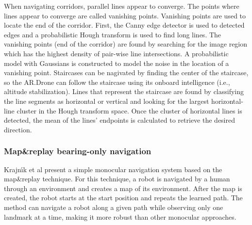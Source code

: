 When navigating corridors, parallel lines appear to converge.
The points where lines appear to converge are called vanishing points.
Vanishing points are used to locate the end of the corridor. 
First, the Canny edge detector \cite{canny1986computational} is used to detected edges and a probabilistic Hough transform \cite{kiryati1991probabilistic} is used to find long lines.
The vanishing points (end of the corridor) are found by searching for the image region which has the highest density of pair-wise line intersections.
A probabilistic model with Gaussians is constructed to model the noise in the location of a vanishing point.
Staircases can be nagivated by finding the center of the staircase, so the AR.Drone can follow the staircase using its onboard intelligence (i.e., altitude stabilization).
Lines that represent the staircase are found by classifying the line segments as horizontal or vertical and looking for the largest horizontal-line cluster in the Hough transform space.
Once the cluster of horizontal lines is detected, the mean of the lines' endpoints is calculated to retrieve the desired direction.

\subsubsection{Map\&replay bearing-only navigation}
Krajn{\'\i}k et al \cite{krajník2010simple,faiglsurveillance,krajník2011ar} present a simple monocular navigation system based on the map\&replay technique.
For this technique, a robot is navigated by a human through an environment and creates a map of its environment.
After the map is created, the robot starts at the start position and repeats the learned path.
The method can navigate a robot along a given path while observing only one landmark at a time, making it more robust than other monocular approaches.

